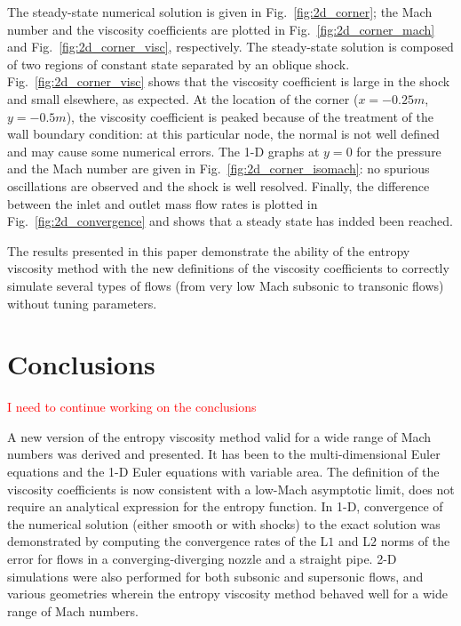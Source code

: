 \documentclass[preprint,10pt]{elsarticle}
\newcommand{\fig}[1]{Fig.~\ref{#1}}                      %
\newcommand{\tcr}[1]{\textcolor{red}{#1}}
\begin{document}
%
The steady-state numerical solution is given in \fig{fig:2d_corner}; the Mach number and the viscosity 
coefficients are plotted in \fig{fig:2d_corner_mach} and \fig{fig:2d_corner_visc}, respectively. The 
steady-state solution is composed of two regions of constant state separated by an oblique shock. 
\fig{fig:2d_corner_visc} shows that the viscosity coefficient is large in the shock and small elsewhere, 
as expected. At the location of the corner ($x=-0.25m$, $y=-0.5m$), the viscosity coefficient is peaked 
because of the treatment of the wall boundary condition: at this particular node, the normal is not well 
defined and may cause some numerical errors. The 1-D graphs at $y=0$ for the pressure and the Mach number 
are given in \fig{fig:2d_corner_isomach}: no spurious oscillations are observed and the shock is well resolved. 
Finally, the difference between the inlet and outlet mass flow rates is plotted in \fig{fig:2d_convergence} 
and shows that a steady state has indded been reached. 

The results presented in this paper demonstrate the ability of the entropy viscosity method with the new definitions of the viscosity coefficients 
to correctly simulate several types of flows (from very low Mach subsonic to transonic flows) without tuning parameters.


\section{Conclusions} \label{sec:ccl}
\tcr{I need to continue working on the conclusions}

A new version of the entropy viscosity method valid for a wide range of Mach numbers was derived and presented.
It has been to the multi-dimensional Euler equations and the 1-D Euler equations with variable area. 
The definition of the viscosity coefficients
is now consistent with a low-Mach asymptotic limit, does not require an analytical expression for the entropy function. 
In 1-D, convergence of the numerical solution (either smooth or with shocks) to 
the exact solution was demonstrated by computing the convergence rates of the L$1$ and L$2$ norms of 
the error for flows in a converging-diverging nozzle and a straight pipe. 2-D simulations were also 
performed for both subsonic and supersonic flows, and various geometries wherein the entropy viscosity 
method behaved well for a wide range of Mach numbers. 
\end{document}
